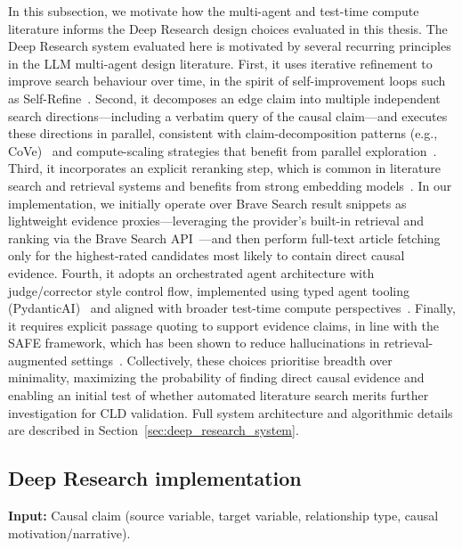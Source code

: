 In this subsection, we motivate how the multi-agent and test-time compute literature informs the Deep Research design choices evaluated in this thesis. The Deep Research system evaluated here is motivated by several recurring principles in the LLM multi-agent design literature. First, it uses iterative refinement to improve search behaviour over time, in the spirit of self-improvement loops such as Self-Refine~\citep{madaan2023selfrefineiterativerefinementselffeedback}. Second, it decomposes an edge claim into multiple independent search directions---including a verbatim query of the causal claim---and executes these directions in parallel, consistent with claim-decomposition patterns (e.g., CoVe)~\citep{dhuliawala2024chain} and compute-scaling strategies that benefit from parallel exploration~\citep{snell2024scalingllmtesttimecompute}. Third, it incorporates an explicit reranking step, which is common in literature search and retrieval systems and benefits from strong embedding models~\citep{muennighoff2023mteb, qwen3embedding2025}. In our implementation, we initially operate over Brave Search result snippets as lightweight evidence proxies---leveraging the provider's built-in retrieval and ranking via the Brave Search API~\citep{bravesearchapi}---and then perform full-text article fetching only for the highest-rated candidates most likely to contain direct causal evidence. Fourth, it adopts an orchestrated agent architecture with judge/corrector style control flow, implemented using typed agent tooling (PydanticAI)~\citep{pydanticai2024} and aligned with broader test-time compute perspectives~\citep{snell2024scalingllmtesttimecompute}. Finally, it requires explicit passage quoting to support evidence claims, in line with the SAFE framework, which has been shown to reduce hallucinations in retrieval-augmented settings~\citep{batista2025safeimprovingllmsystems}. Collectively, these choices prioritise breadth over minimality, maximizing the probability of finding direct causal evidence and enabling an initial test of whether automated literature search merits further investigation for CLD validation. Full system architecture and algorithmic details are described in Section~\ref{sec:deep_research_system}.

\subsection{Deep Research implementation}

\textbf{Input:} Causal claim (source variable, target variable, relationship type, causal motivation/narrative).

